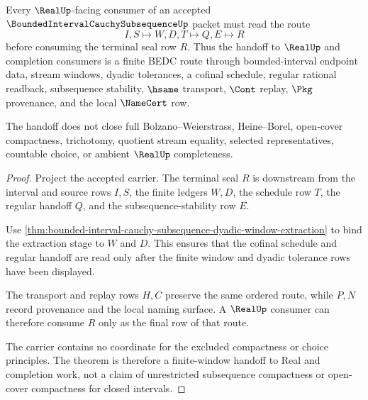 \begin{theorem}
\label{thm:bounded-interval-cauchy-subsequence-real-seal-handoff}
Every $\RealUp$-facing consumer of an accepted $\BoundedIntervalCauchySubsequenceUp$ packet must read the route
$$
I,S \longmapsto W,D,T \longmapsto Q,E \longmapsto R
$$
before consuming the terminal seal row $R$. Thus the handoff to $\RealUp$ and completion consumers is a finite BEDC route through bounded-interval endpoint data, stream windows, dyadic tolerances, a cofinal schedule, regular rational readback, subsequence stability, $\hsame$ transport, $\Cont$ replay, $\Pkg$ provenance, and the local $\NameCert$ row.

The handoff does not close full Bolzano--Weierstrass, Heine--Borel, open-cover compactness, trichotomy, quotient stream equality, selected representatives, countable choice, or ambient $\RealUp$ completeness.
\end{theorem}
\begin{proof}
Project the accepted carrier. The terminal seal $R$ is downstream from the interval and source rows $I,S$, the finite ledgers $W,D$, the schedule row $T$, the regular handoff $Q$, and the subsequence-stability row $E$.

Use \autoref{thm:bounded-interval-cauchy-subsequence-dyadic-window-extraction} to bind the extraction stage to $W$ and $D$. This ensures that the cofinal schedule and regular handoff are read only after the finite window and dyadic tolerance rows have been displayed.

The transport and replay rows $H,C$ preserve the same ordered route, while $P,N$ record provenance and the local naming surface. A $\RealUp$ consumer can therefore consume $R$ only as the final row of that route.

The carrier contains no coordinate for the excluded compactness or choice principles. The theorem is therefore a finite-window handoff to Real and completion work, not a claim of unrestricted subsequence compactness or open-cover compactness for closed intervals.
\end{proof}


